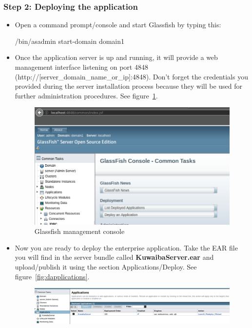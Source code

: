 \documentclass[a4paper]{article}
\begin{document}
			\subsubsection{Step 2: Deploying the application}
			\begin{itemize}
				\item Open a command prompt/console and start Glassfish by typing this:
				\begin{verbbox}
					/bin/asadmin start-domain domain1
				\end{verbbox}
				\begin{figure}[h!]
					\centering	
					\theverbbox
				\end{figure}
				\item Once the application server is up and running, it will provide a web management interface listening on port 4848 (http://[server\_domain\_name\_or\_ip]:4848). Don't forget the credentials you provided during the server installation process because they will be used for further administration procedures. See figure~\ref{fig:gf_mgmconsole}.
				\begin{figure}[h!]
					\centering
					\includegraphics[width=0.8\linewidth]{img/gf_management_console.jpg} 
					\caption{Glassfish management console}
					\label{fig:gf_mgmconsole}
				\end{figure}		
				\item Now you are ready to deploy the enterprise application. Take the EAR file you will find in the server bundle called \textbf{KuwaibaServer.ear} and upload/publish it using the section Applications/Deploy. See figure~\ref{fig:dapplications}.
				\begin{figure}[h!]
					\includegraphics[width=\linewidth]{img/gf_deployed_applications.jpg} 		

\end{figure}
\end{itemize}
\end{document}
